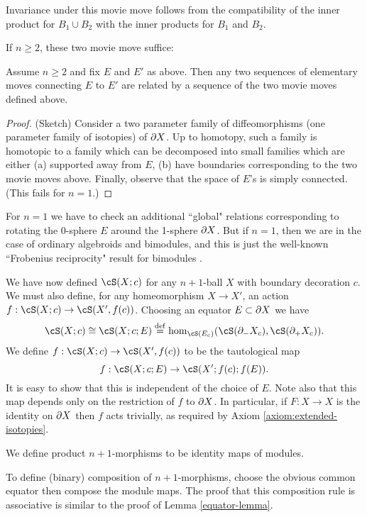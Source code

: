 Invariance under this movie move follows from the compatibility of the inner
product for $B_1\cup B_2$ with the inner products for $B_1$ and $B_2$.


If $n\ge 2$, these two movie move suffice:

\begin{lem}
Assume $n\ge 2$ and fix $E$ and $E'$ as above.
Then any two sequences of elementary moves connecting $E$ to $E'$
are related by a sequence of the two movie moves defined above.
\end{lem}

\begin{proof}
(Sketch)
Consider a two parameter family of diffeomorphisms (one parameter family of isotopies) 
of $\partial X$.
Up to homotopy,
such a family is homotopic to a family which can be decomposed 
into small families which are either
(a) supported away from $E$, 
(b) have boundaries corresponding to the two movie moves above.
Finally, observe that the space of $E$'s is simply connected.
(This fails for $n=1$.)
\end{proof}

For $n=1$ we have to check an additional ``global" relations corresponding to 
rotating the 0-sphere $E$ around the 1-sphere $\partial X$.
But if $n=1$, then we are in the case of ordinary algebroids and bimodules,
and this is just the well-known ``Frobenius reciprocity" result for bimodules \cite{MR1424954}.

\medskip

We have now defined $\cS(X; c)$ for any $n{+}1$-ball $X$ with boundary decoration $c$.
We must also define, for any homeomorphism $X\to X'$, an action $f: \cS(X; c) \to \cS(X', f(c))$.
Choosing an equator $E\subset \partial X$ we have 
\[
	\cS(X; c) \cong \cS(X; c; E) \deq \hom_{\cS(E_c)}(\cS(\bd_-X_c), \cS(\bd_+X_c)) .
\]
We define $f: \cS(X; c) \to \cS(X', f(c))$ to be the tautological map
\[
	f: \cS(X; c; E) \to \cS(X'; f(c); f(E)) .
\]
It is easy to show that this is independent of the choice of $E$.
Note also that this map depends only on the restriction of $f$ to $\partial X$.
In particular, if $F: X\to X$ is the identity on $\partial X$ then $f$ acts trivially, as required by
Axiom \ref{axiom:extended-isotopies}.

We define product $n{+}1$-morphisms to be identity maps of modules.

To define (binary) composition of $n{+}1$-morphisms, choose the obvious common equator
then compose the module maps.
The proof that this composition rule is associative is similar to the proof of Lemma \ref{equator-lemma}.
